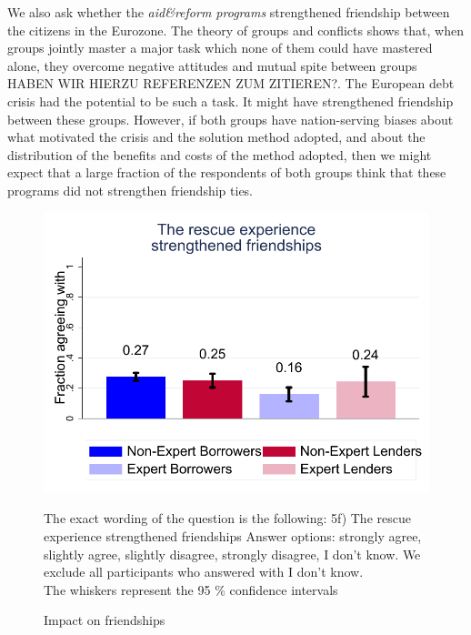 We also ask whether the \textit{aid\&reform programs} strengthened friendship between the citizens in the Eurozone. The theory of groups and conflicts shows that, when groups jointly master a major task which none of them could have mastered alone, they overcome negative attitudes and mutual spite between groups HABEN WIR HIERZU REFERENZEN ZUM ZITIEREN?. The European debt crisis had the potential to be 
such a task. It might have strengthened friendship between these groups.
However, if both groups have nation-serving biases about what
motivated the crisis and the solution method adopted, and about the
distribution of the benefits and costs of the method adopted, then we might
expect that a large fraction of the respondents of both groups think that
these programs did not strengthen friendship ties. 
\begin{figure}
\begin{center}
\caption{Impact on friendships}
\includegraphics[scale=0.5]{graph5_3.pdf}
\label{fig:figure5}
\end{center}
\tiny 
\begin{tablenotes}
  {The exact wording of the question is the following: 5f) The rescue experience strengthened friendships
   Answer options: strongly agree, slightly agree, slightly disagree, strongly disagree, I don't know. We exclude all participants who answered with I don't know. \\
     The whiskers represent the 95 \% confidence intervals}
    \end{tablenotes}
\end{figure}

